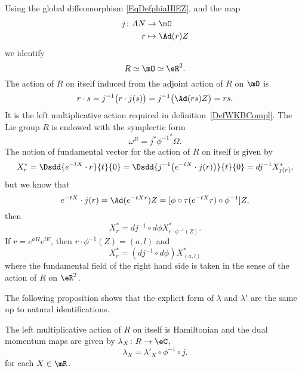 Using the global diffeomorphism \eqref{EqDefphiaHlEZ}, and the map
\begin{equation}
\begin{aligned}
 j\colon AN&\to \mO \\
r&\mapsto \Ad(r)Z
\end{aligned}
\end{equation}
we identify
\[
   R\simeq\mO\simeq\eR^2.
\]
The action of $R$ on itself induced from the adjoint action of $R$ on $\mO$ is
\[
  r\cdot s=j^{-1}\big( r\cdot j(s) \big)=j^{-1}\big( \Ad(rs)Z \big)=rs.
\]
It is the left multiplicative action required in definition~\ref{DefWKBCompl}. The Lie group $R$ is endowed with the symplectic form
\[
\omega^R=j^*{\phi^{-1}}^*\Omega.
\]
The notion of fundamental vector for the action of $R$ on itself is given by
\begin{equation}
  X^*_r=\Dsdd{e^{-tX}\cdot r}{t}{0}
        =\Dsdd{ j^{-1}\big( e^{-tX}\cdot j(r) \big) }{t}{0}
        =dj^{-1} X^*_{j(r)},
\end{equation}
but we know that
\[
  e^{-tX}\cdot j(r)=\Ad(e^{-tX r})Z=[\phi\circ \tau(e^{-tX}r)\circ \phi^{-1}]Z,
\]
 then
\[
X^*_r=dj^{-1}\circ d\phi X^*_{r\cdot \phi^{-1}(Z)}.
\]
If $r=e^{aH}e^{lE}$, then $r\cdot \phi^{-1}(Z)=(a,l)$ and
\begin{equation}
   X^*_r=(dj^{-1}\circ d\phi) X^*_{(a,l)}
\end{equation}
where the fundamental field of the right hand side is taken in the sense of the action of $R$ on $\eR^2$.

The following proposition shows that the explicit form of $\lambda$ and $\lambda'$ are the same up to natural identifications.

\begin{proposition}
The left multiplicative action of $R$ on itself is Hamiltonian and the dual momentum maps are given by  $\lambda_X\colon R\to \eC$,
\begin{equation}
\lambda_X= \lambda'_X\circ\phi^{-1}\circ j.
\end{equation}
for each $X\in\mR$.
\label{PropMomslR}
\end{proposition}

